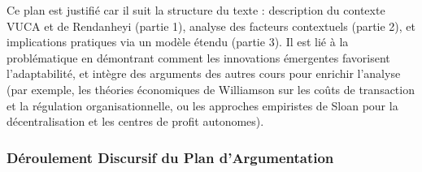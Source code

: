 \documentclass{rapportECL}
\begin{document}
Ce plan est justifié car il suit la structure du texte : description du contexte VUCA et de Rendanheyi (partie 1), analyse des facteurs contextuels (partie 2), et implications pratiques via un modèle étendu (partie 3). Il est lié à la problématique en démontrant comment les innovations émergentes favorisent l'adaptabilité, et intègre des arguments des autres cours pour enrichir l'analyse (par exemple, les théories économiques de Williamson sur les coûts de transaction et la régulation organisationnelle, ou les approches empiristes de Sloan pour la décentralisation et les centres de profit autonomes).

\subsubsection{Déroulement Discursif du Plan d’Argumentation}
\end{document}
